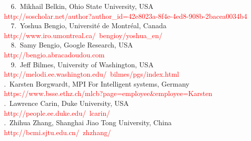 \documentclass[a4paper,12pt,oneside]{book}
\newcommand{\red}[1]{  \textcolor{red}  {#1}}   %
\begin{document}
\noindent ~~6.~Mikhail Belkin, Ohio State University, USA\\
\indent\red{http://soscholar.net/author?author\_id=42e8023a-8f4e-4ed8-908b-2bacea0034b4}\\

\noindent ~~7.~Yoshua Bengio, Université de Montréal, Canada\\
\indent\red{http://www.iro.umontreal.ca/~bengioy/yoshua\_en/}\\

\noindent ~~8.~Samy Bengio, Google Research, USA\\
\indent\red{http://bengio.abracadoudou.com}\\

\noindent ~~9.~Jeff Bilmes, University of Washington, USA\\
\indent\red{http://melodi.ee.washington.edu/~bilmes/pgs/index.html}\\

.~Karsten Borgwardt, MPI For Intelligent systems, Germany\\
\indent\red{https://www.bsse.ethz.ch/mlcb?page=employee\&employee=Karsten}\\

.~Lawrence Carin, Duke University, USA\\
\indent\red{http://people.ee.duke.edu/~lcarin/}\\

.~Zhihua Zhang, Shanghai Jiao Tong University, China\\
\indent\red{http://bcmi.sjtu.edu.cn/~zhzhang/}\\



\end{document}

